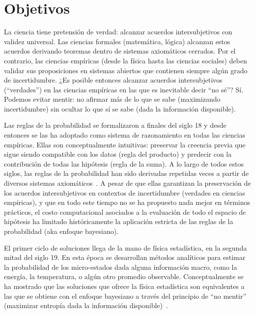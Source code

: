 \documentclass[10pt]{article}
\begin{document}
\section{Objetivos}

La ciencia tiene pretensión de verdad: alcanzar acuerdos intersubjetivos con validez universal.
Las ciencias formales (matemática, lógica) alcanzan estos acuerdos derivando teoremas dentro de sistemas axiomáticos cerrados.
Por el contrario, las ciencias empíricas (desde la física hasta las ciencias sociales) deben validar sus proposiciones en sistemas abiertos que contienen siempre algún grado de incertidumbre.
¿Es posible entonces alcanzar acuerdos intersubjetivos (``verdades'') en las ciencias empíricas en las que es inevitable decir ``no sé''?
Sí.
Podemos evitar mentir: no afirmar más de lo que se sabe (maximizando incertidumbre) sin ocultar lo que sí se sabe (dada la información disponible).


Las reglas de la probabilidad se formalizaron a finales del siglo 18 y desde entonces se las ha adoptado como sistema de razonamiento en todas las ciencias empíricas.
Ellas son conceptualmente intuitivas: preservar la creencia previa que sigue siendo compatible con los datos (regla del producto) y predecir con la contribución de todas las hipótesis (regla de la suma).
A lo largo de todos estos siglos, las reglas de la probabilidad han sido derivadas repetidas veces a partir de diversos sistemas axiomáticos~\cite{halpern2017}.
A pesar de que ellas garantizan la preservación de los acuerdos intersubjetivos en contextos de incertidumbre (verdades en ciencias empíricas), y que en todo este tiempo no se ha propuesto nada mejor en términos prácticos, el costo computacional asociados a la evaluación de todo el espacio de hipótesis ha limitado históricamente la aplicación estricta de las reglas de la probabilidad (aka enfoque bayesiano).


El primer ciclo de soluciones llega de la mano de física estadística, en la segunda mitad del siglo 19.
En esta época se desarrollan métodos analíticos para estimar la probabilidad de los micro-estados dada alguna información macro, como la energía, la temperatura, o algún otro promedio observable.
Conceptualmente se ha mostrado que las soluciones que ofrece la física estadística son equivalentes a las que se obtiene con el enfoque bayesiano a través del principio de ``no mentir'' (maximizar entropía dada la información disponible)~\cite{jaynes1957-informationTheoryAndStatisticalMechanics, jaynes2003-bookProbabilityTheory}.
\end{document}
